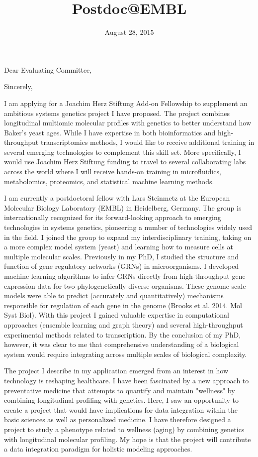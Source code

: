 \documentclass[11pt,a4paper,sans]{moderncv}        %
\title{Postdoc@EMBL}                               %
\begin{document}
\date{August 28, 2015}
\opening{Dear Evaluating Committee,}
\closing{Sincerely,}
\makelettertitle

I am applying for a Joachim Herz Stiftung Add-on Fellowship to supplement an ambitious systems genetics project I have proposed. The project combines longitudinal multiomic molecular profiles with genetics to better understand how Baker's yeast ages. While I have expertise in both bioinformatics and  high-throughput transcriptomics methods, I would like to receive additional training in several emerging technologies to complement this skill set. More specifically, I would use Joachim Herz Stiftung funding to travel to several collaborating labs across the world where I will receive hands-on training in microfluidics, metabolomics, proteomics, and statistical machine learning methods.

I am currently a postdoctoral fellow with Lars Steinmetz at the European Molecular Biology Laboratory (EMBL) in Heidelberg, Germany. The group is internationally recognized for its forward-looking approach to emerging technologies in systems genetics, pioneering a number of technologies widely used in the field. I joined the group to expand my interdisciplinary training, taking on a more complex model system (yeast) and learning how to measure cells at multiple molecular scales. Previously in my PhD, I studied the structure and function of gene regulatory networks (GRNs) in microorganisms. I developed machine learning algorithms to infer GRNs directly from high-throughput gene expression data for two phylogenetically diverse organisms. These genome-scale models were able to predict (accurately and quantitatively) mechanisms responsible for regulation of each gene in the genome (Brooks et al. 2014. Mol Syst Biol). With this project I gained valuable expertise in computational approaches (ensemble learning and graph theory) and several high-throughput experimental methods related to transcription. By the conclusion of my PhD, however, it was clear to me that comprehensive understanding of a biological system would require integrating across multiple scales of biological complexity.

The project I describe in my application emerged from an interest in how technology is reshaping healthcare. I have been fascinated by a new approach to preventative medicine that attempts to quantify and maintain "wellness" by combining longitudinal profiling with genetics.  Here, I saw an opportunity to create a project that would have implications for data integration within the basic sciences as well as personalized medicine. I have therefore designed a project to study a phenotype related to wellness (aging) by combining genetics with longitudinal molecular profiling. My hope is that the project will contribute a data integration paradigm for holistic modeling approaches.
\end{document}
